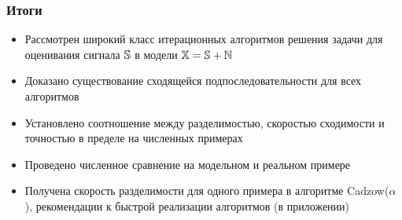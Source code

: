 \documentclass[unicode, notheorems]{beamer}
\begin{document}

\begin{frame}
	\frametitle{Итоги}
	\begin{itemize}
		\item Рассмотрен широкий класс итерационных алгоритмов решения задачи 
		для оценивания сигнала $\mathbb{S}$  в модели $\mathbb{X} = \mathbb{S} + \mathbb{N}$
		\item Доказано существование сходящейся подпоследовательности для всех алгоритмов
		\item Установлено соотношение между разделимостью, скоростью сходимости и точностью в пределе на численных примерах
		\item Проведено численное сравнение на модельном и реальном примере
		\item Получена скорость разделимости для одного примера в алгоритме Cadzow($\alpha$), рекомендации к быстрой реализации алгоритмов (в приложении)
	\end{itemize}
	
\end{frame}


\end{document}
